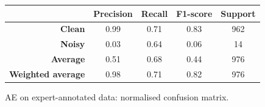 \documentclass[a4paper,10pt]{article}
\begin{document}
\begin{figure}[p]
{\begin{minipage}{0.6\textwidth}
			\caption{AE on expert-annotated data: normalised confusion matrix.}%
			\label{fig:ae_segm_cm}
		\end{minipage}
	}
	\baselineskip
	\begin{tabular}{r|c|c|c|c}
		                          & \textbf{Precision} & \textbf{Recall} & \textbf{F1-score} & \textbf{Support} \\ \midrule
		\textbf{Clean}            & 0.99               & 0.71            & 0.83              & 962              \\
		\textbf{Noisy}            & 0.03               & 0.64            & 0.06              & 14               \\ \midrule
		\textbf{Average}          & 0.51               & 0.68            & 0.44              & 976              \\
		\textbf{Weighted average} & 0.98               & 0.71            & 0.82              & 976
	\end{tabular}
	\label{tab:ae_segm_cr}
\end{figure}
\end{document}
